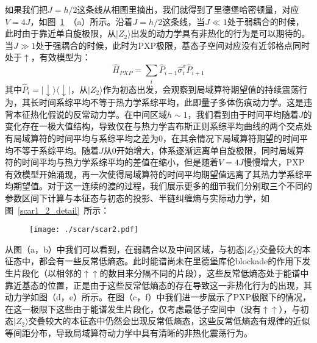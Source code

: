 如果我们把$J=h/2$这条线从相图里摘出，我们就得到了里德堡哈密顿量，对应$V=4J$，如图~\ref{scar1_2}~（a）所示。沿着$J=h/2$这条线，当$J\ll 1$处于弱耦合的时候，此时由于靠近单自旋极限，从$|Z_2\rangle$出发的动力学具有非热化的行为是可以期待的。当$J\gg 1$处于强耦合的时候，此时为PXP极限，基态子空间对应没有近邻格点同时处于$\uparrow$，有效模型为：
\begin{equation}
	\hat{H}_{PXP} = \sum_i\hat{P}_{i-1}\hat{\sigma}_{i}^x\hat{P}_{i+1}
\end{equation}
其中$\hat{P}_i=|\downarrow\rangle\langle\downarrow|$，从$|Z_2\rangle$作为初态出发，会观察到局域算符期望值的持续震荡行为，其长时间系综平均不等于热力学系综平均，此即量子多体伤痕动力学。这是违背本征热化假说的反常动力学。在中间区域$h\sim 1$，我们看到由于时间平均随着$J$的变化存在一极大值结构，导致仅在与热力学吉布斯正则系综平均曲线的两个交点处有局域算符的时间平均与系综平均之差为0，在其余情况下局域算符期望的时间平均不等于系综平均。随着$J$从0开始增大，体系逐渐远离单自旋极限，同时局域算符的时间平均与热力学系综平均的差值在缩小，但是随着$V=4J$慢慢增大，PXP有效模型开始涌现，再一次使得局域算符的时间平均期望值远离了其热力学系综平均期望值。对于这一连续的渡的过程，我们展示更多的细节我们分别取三个不同的参数区间下计算与本征态与初态的投影、半链纠缠熵与实际动力学，如图~\ref{scar1_2_detail}~所示：
\begin{figure}[h]
\centering
\texttt{[image: ./scar/scar2.pdf]}
\label{scar1_2}
\end{figure}
从图（a，b）中我们可以看到，在弱耦合以及中间区域，与初态$|Z_2\rangle$交叠较大的本征态中，都会有一些反常低熵态。此时能谱尚未在里德堡库伦blockade的作用下发生片段化（以相邻的$\uparrow\uparrow$的数目来分隔不同的片段），这些反常低熵态处于能谱中靠近基态的位置，正是由于这些反常低熵态的存在导致这一非热化行为的出现，其动力学如图（d，e）所示。在图（c，f）中我们进一步展示了PXP极限下的情况，在这一极限下这些由于能谱发生片段化，仅考虑最低子空间中（没有$\uparrow\uparrow$），与初态$|Z_2\rangle$交叠较大的本征态中仍然会出现反常低熵态，这些反常低熵态有规律的近似等间距分布，导致局域算符动力学中具有清晰的非热化震荡行为。
